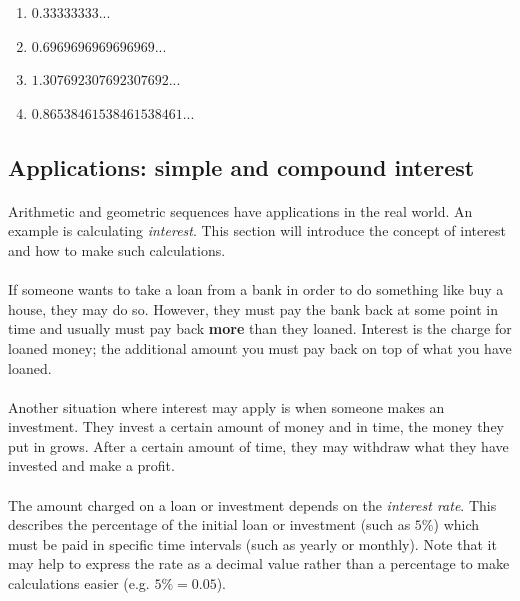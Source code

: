 \documentclass[12pt, a4paper, titlepage, twoside]{article}
\begin{document}
	\begin{multicols}{2}
		\begin{enumerate}[label=\textbf{(\alph*)}]
			\item $0.33333333...$
			\item $0.6969696969696969...$
			\item $1.307692307692307692...$
			\item $0.86538461538461538461...$
		\end{enumerate}
	\end{multicols}

	\newpage	
	
	\subsection{Applications: simple and compound interest}
	
	\paragraph{}
	Arithmetic and geometric sequences have applications in the real world. An example is calculating \textit{interest}. This section will
	introduce the concept of interest and how to make such calculations.
	
	\paragraph{}
	If someone wants to take a loan from a bank in order to do something like buy a house, they may do so. However, they must
	pay the bank back at some point in time and usually must pay back \textbf{more} than they loaned. Interest is the charge for
	loaned money; the additional amount you must pay back on top of what you have loaned.
	
	\paragraph{}
	Another situation where interest may apply is when someone makes an investment. They invest a certain amount of money and in 
	time, the money they put in grows. After a certain amount of time, they may withdraw what they have invested and make a profit.
	
	\paragraph{}
	The amount charged on a loan or investment depends on the \textit{interest rate}. This describes the percentage of the initial
	loan or investment (such as $5\%$) which must be paid in specific time intervals (such as yearly or monthly). Note that it may help
	to express the rate as a decimal value rather than a percentage to make calculations easier (e.g. $5\% = 0.05$).
	
\end{document}

